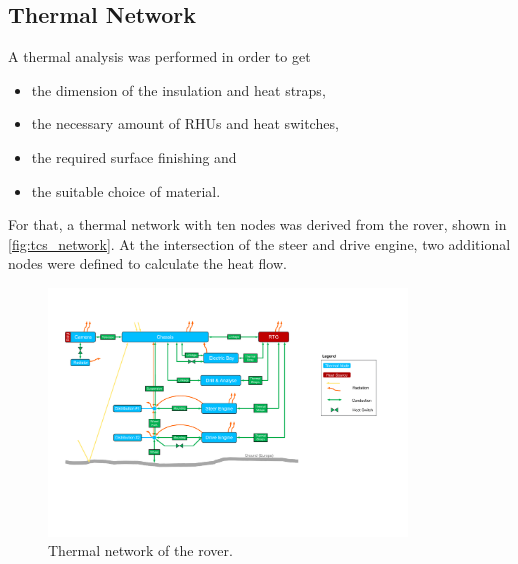 \subsection{Thermal Network}
A thermal analysis was performed in order to get
\begin{itemize}
	\item the dimension of the insulation and heat straps,
	\item the necessary amount of RHUs and heat switches,
	\item the required surface finishing and
	\item the suitable choice of material.\\
\end{itemize}

For that, a thermal network with ten nodes was derived from the rover, shown in \autoref{fig:tcs_network}.
At the intersection of the steer and drive engine, two additional nodes were defined to calculate the heat flow.

\begin{figure}[h]
	\centering
	\includegraphics[width=0.85\textwidth]{Media/tcs_network}
	\caption{Thermal network of the rover.}
	\label{fig:tcs_network}
\end{figure}

